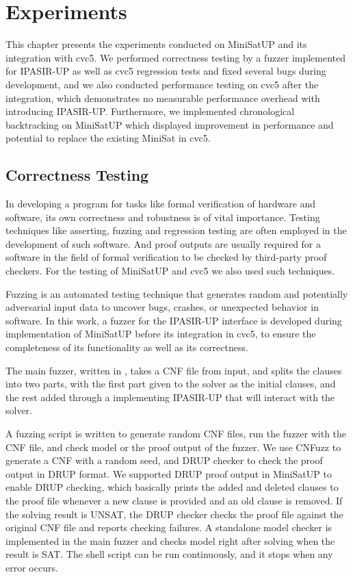 \chapter{Experiments}

This chapter presents the experiments conducted on MiniSatUP and its integration with cvc5. We performed correctness testing by a fuzzer implemented for IPASIR-UP as well as cvc5 regression tests and fixed several bugs during development, and we also conducted performance testing on cvc5 after the integration, which demonstrates no measurable performance overhead with introducing IPASIR-UP. Furthermore, we implemented chronological backtracking on MiniSatUP which displayed improvement in performance and potential to replace the existing MiniSat in cvc5.

\section{Correctness Testing}

In developing a program for tasks like formal verification of hardware and software, its own correctness and robustness is of vital importance. Testing techniques like asserting, fuzzing and regression testing are often employed in the development of such software. And proof outputs are usually required for a software in the field of formal verification to be checked by third-party proof checkers. For the testing of MiniSatUP and cvc5 we also used such techniques.

Fuzzing is an automated testing technique that generates random and potentially adversarial input data to uncover bugs, crashes, or unexpected behavior in software. In this work, a fuzzer for the IPASIR-UP interface is developed during implementation of MiniSatUP before its integration in cvc5, to ensure the completeness of its functionality as well as its correctness.

The main fuzzer, written in , takes a CNF file from input, and splits the clauses into two parts, with the first part given to the solver as the initial clauses, and the rest added through a  implementing IPASIR-UP that will interact with the solver.

A fuzzing script is written to generate random CNF files, run the fuzzer with the CNF file, and check model or the proof output of the fuzzer. We use CNFuzz \cite{BrummayerLonsingBiere-SAT10} to generate a CNF with a random seed, and DRUP checker \cite{6679408} to check the proof output in DRUP format. We supported DRUP proof output in MiniSatUP to enable DRUP checking, which basically prints the added and deleted clauses to the proof file whenever a new clause is provided and an old clause is removed. If the solving result is UNSAT, the DRUP checker checks the proof file against the original CNF file and reports checking failures. A standalone model checker is implemented in the main fuzzer and checks model right after solving when the result is SAT. The shell script can be run continuously, and it stops when any error occurs.

